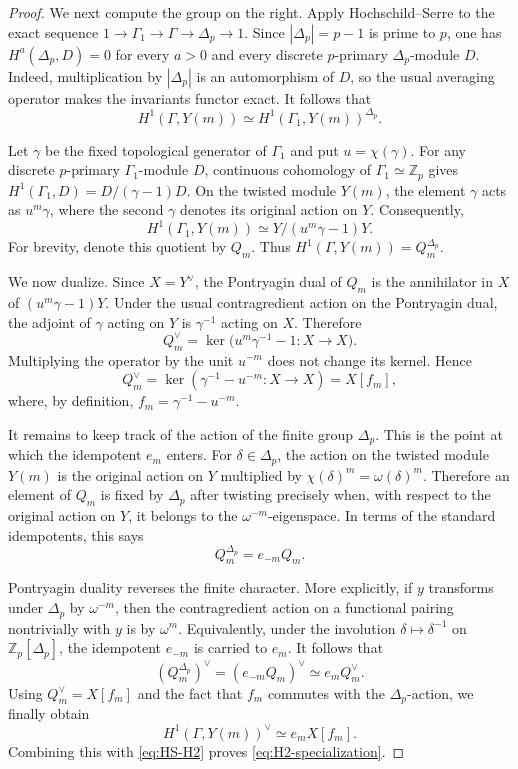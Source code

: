 \documentclass[11pt]{amsart}
\numberwithin{equation}{section}
\newcommand{\Zp}{\mathbb Z_p}
\theoremstyle{definition}
\begin{document}
\begin{proof}
We next compute the group on the right. Apply Hochschild--Serre to
the exact sequence $1\to\Gamma_1\to\Gamma\to\Delta_p\to1$. Since
$|\Delta_p|=p-1$ is prime to $p$, one has
$H^a(\Delta_p,D)=0$ for every $a>0$ and every discrete
$p$-primary $\Delta_p$-module $D$. Indeed, multiplication by
$|\Delta_p|$ is an automorphism of $D$, so the usual averaging
operator makes the invariants functor exact. It follows that
\[
 H^1(\Gamma,Y(m))
 \simeq H^1(\Gamma_1,Y(m))^{\Delta_p}.
\]

Let $\gamma$ be the fixed topological generator of $\Gamma_1$ and
put $u=\chi(\gamma)$. For any discrete $p$-primary
$\Gamma_1$-module $D$, continuous cohomology of
$\Gamma_1\simeq\Zp$ gives
$H^1(\Gamma_1,D)=D/(\gamma-1)D$. On the twisted module $Y(m)$,
the element $\gamma$ acts as $u^m\gamma$, where the second
$\gamma$ denotes its original action on $Y$. Consequently,
\[
 H^1(\Gamma_1,Y(m))
 \simeq Y/(u^m\gamma-1)Y.
\]
For brevity, denote this quotient by $Q_m$. Thus
$H^1(\Gamma,Y(m))=Q_m^{\Delta_p}$.

We now dualize. Since $X=Y^\vee$, the Pontryagin dual of $Q_m$ is
the annihilator in $X$ of $(u^m\gamma-1)Y$. Under the usual
contragredient action on the Pontryagin dual, the adjoint of
$\gamma$ acting on $Y$ is $\gamma^{-1}$ acting on $X$. Therefore
\[
 Q_m^\vee
 =
 \ker\bigl(u^m\gamma^{-1}-1:X\longrightarrow X\bigr).
\]
Multiplying the operator by the unit $u^{-m}$ does not change its
kernel. Hence
\[
 Q_m^\vee
 =
 \ker(\gamma^{-1}-u^{-m}:X\longrightarrow X)
 =
 X[f_m],
\]
where, by definition, $f_m=\gamma^{-1}-u^{-m}$.

It remains to keep track of the action of the finite group
$\Delta_p$. This is the point at which the idempotent $e_m$ enters.
For $\delta\in\Delta_p$, the action on the twisted module $Y(m)$ is
the original action on $Y$ multiplied by
$\chi(\delta)^m=\omega(\delta)^m$. Therefore an element of $Q_m$
is fixed by $\Delta_p$ after twisting precisely when, with respect
to the original action on $Y$, it belongs to the
$\omega^{-m}$-eigenspace. In terms of the standard idempotents,
this says
\[
 Q_m^{\Delta_p}=e_{-m}Q_m.
\]

Pontryagin duality reverses the finite character. More explicitly,
if $y$ transforms under $\Delta_p$ by $\omega^{-m}$, then the
contragredient action on a functional pairing nontrivially with
$y$ is by $\omega^m$. Equivalently, under the involution
$\delta\mapsto\delta^{-1}$ on $\Zp[\Delta_p]$, the idempotent
$e_{-m}$ is carried to $e_m$. It follows that
\[
 (Q_m^{\Delta_p})^\vee
 =
 (e_{-m}Q_m)^\vee
 \simeq e_mQ_m^\vee.
\]
Using $Q_m^\vee=X[f_m]$ and the fact that $f_m$ commutes with the
$\Delta_p$-action, we finally obtain
\[
 H^1(\Gamma,Y(m))^\vee
 \simeq e_mX[f_m].
\]
Combining this with \eqref{eq:HS-H2} proves
\eqref{eq:H2-specialization}.
\end{proof}
\end{document}
